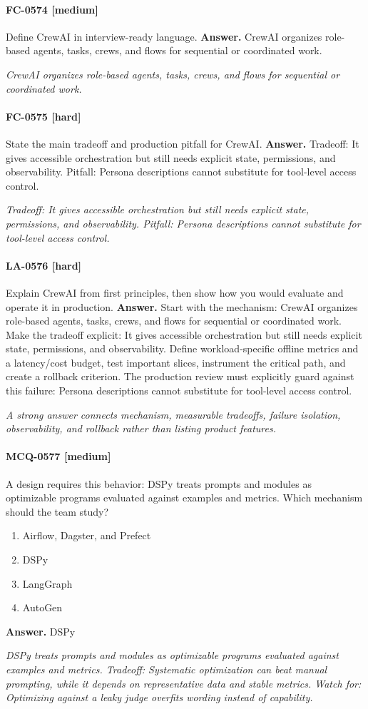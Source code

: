 \paragraph{FC-0574 [medium]} Define CrewAI in interview-ready language.
\noindent\textbf{Answer.} CrewAI organizes role-based agents, tasks, crews, and flows for sequential or coordinated work.
\par\textit{CrewAI organizes role-based agents, tasks, crews, and flows for sequential or coordinated work.}
\paragraph{FC-0575 [hard]} State the main tradeoff and production pitfall for CrewAI.
\noindent\textbf{Answer.} Tradeoff: It gives accessible orchestration but still needs explicit state, permissions, and observability. Pitfall: Persona descriptions cannot substitute for tool-level access control.
\par\textit{Tradeoff: It gives accessible orchestration but still needs explicit state, permissions, and observability. Pitfall: Persona descriptions cannot substitute for tool-level access control.}
\paragraph{LA-0576 [hard]} Explain CrewAI from first principles, then show how you would evaluate and operate it in production.
\noindent\textbf{Answer.} Start with the mechanism: CrewAI organizes role-based agents, tasks, crews, and flows for sequential or coordinated work. Make the tradeoff explicit: It gives accessible orchestration but still needs explicit state, permissions, and observability. Define workload-specific offline metrics and a latency/cost budget, test important slices, instrument the critical path, and create a rollback criterion. The production review must explicitly guard against this failure: Persona descriptions cannot substitute for tool-level access control.
\par\textit{A strong answer connects mechanism, measurable tradeoffs, failure isolation, observability, and rollback rather than listing product features.}
\paragraph{MCQ-0577 [medium]} A design requires this behavior: DSPy treats prompts and modules as optimizable programs evaluated against examples and metrics. Which mechanism should the team study?
\begin{enumerate}[label=\Alph*.]
\item Airflow, Dagster, and Prefect
\item DSPy
\item LangGraph
\item AutoGen
\end{enumerate}
\noindent\textbf{Answer.} DSPy
\par\textit{DSPy treats prompts and modules as optimizable programs evaluated against examples and metrics. Tradeoff: Systematic optimization can beat manual prompting, while it depends on representative data and stable metrics. Watch for: Optimizing against a leaky judge overfits wording instead of capability.}
